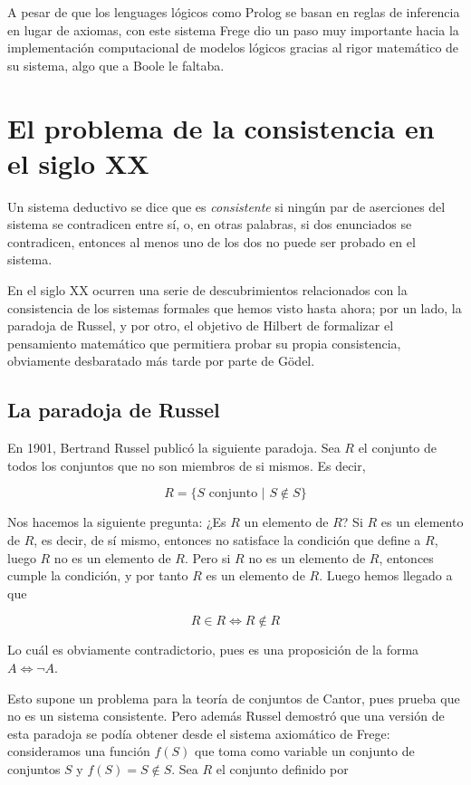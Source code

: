 \documentclass{article}
\begin{document}
A pesar de que los lenguages lógicos como Prolog se basan en reglas de inferencia en lugar de axiomas, con este sistema Frege dio un paso muy importante hacia la implementación computacional de modelos lógicos gracias al rigor matemático de su sistema, algo que a Boole le faltaba.

\section{El problema de la consistencia en el siglo XX}

Un sistema deductivo se dice que es \textit{consistente} si ningún par de aserciones del sistema se contradicen entre sí, o, en otras palabras, si dos enunciados se contradicen, entonces al menos uno de los dos no puede ser probado en el sistema\cite{tarski1994introduction}.

En el siglo XX ocurren una serie de descubrimientos relacionados con la consistencia de los sistemas formales que hemos visto hasta ahora; por un lado, la paradoja de Russel, y por otro, el objetivo de Hilbert de formalizar el pensamiento matemático que permitiera probar su propia consistencia, obviamente desbaratado más tarde por parte de Gödel.

\subsection{La paradoja de Russel}

En 1901, Bertrand Russel publicó la siguiente paradoja. Sea $R$ el conjunto de todos los conjuntos que no son miembros de si mismos. Es decir,

$$
    R = \{S \,\, \text{conjunto} \,\, | \,\, S \notin S\}
$$

Nos hacemos la siguiente pregunta: ¿Es $R$ un elemento de $R$? Si $R$ es un elemento de $R$, es decir, de sí mismo, entonces no satisface la condición que define a $R$, luego $R$ no es un elemento de $R$. Pero si $R$ no es un elemento de $R$, entonces cumple la condición, y por tanto $R$ es un elemento de $R$. Luego hemos llegado a que

$$
    R \in R \iff R \notin R
$$

Lo cuál es obviamente contradictorio, pues es una proposición de la forma $A \iff \lnot A$.

Esto supone un problema para la teoría de conjuntos de Cantor, pues prueba que no es un sistema consistente. Pero además Russel demostró que una versión de esta paradoja se podía obtener desde el sistema axiomático de Frege: consideramos una función $f(S)$ que toma como variable un conjunto de conjuntos $S$ y $f(S) = S \notin S$. Sea $R$ el conjunto definido por
\end{document}
